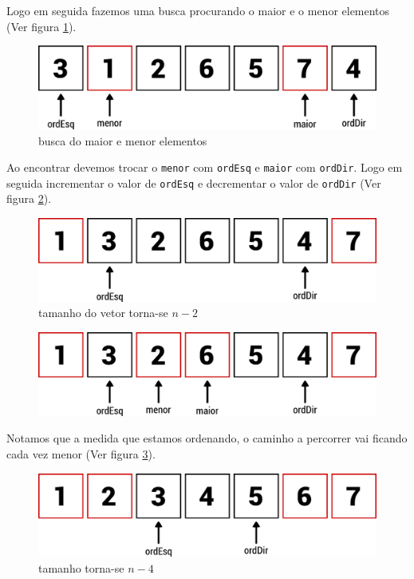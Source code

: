 Logo em seguida fazemos uma busca procurando o maior e o menor elementos
(Ver figura \ref{fig:passo2}).

\begin{figure}[t]
   \includegraphics[scale=0.6]{img/maior.menor.algoritmo/passo2.png}
   \caption{busca do maior e menor elementos}
   \label{fig:passo2}
\end{figure}

Ao encontrar devemos trocar o \texttt{menor} com \texttt{ordEsq} e
\texttt{maior} com \texttt{ordDir}. Logo em seguida incrementar o valor
de \texttt{ordEsq} e decrementar o valor de \texttt{ordDir} (Ver figura
\ref{fig:passo3}).

\begin{figure}[h]
   \includegraphics[scale=0.6]{img/maior.menor.algoritmo/passo3.png}
   \caption{tamanho do vetor torna-se $n - 2$}
   \label{fig:passo3}
\end{figure}

\begin{figure}[p]
   \includegraphics[scale=0.6]{img/maior.menor.algoritmo/passo4.png}
\end{figure}

Notamos que a medida que estamos ordenando, o caminho a percorrer vai
ficando cada vez menor (Ver figura \ref{fig:passo5}).

\begin{figure}[p]
   \includegraphics[scale=0.6]{img/maior.menor.algoritmo/passo5.png}
   \caption{tamanho torna-se $n - 4$}
   \label{fig:passo5}
\end{figure}

